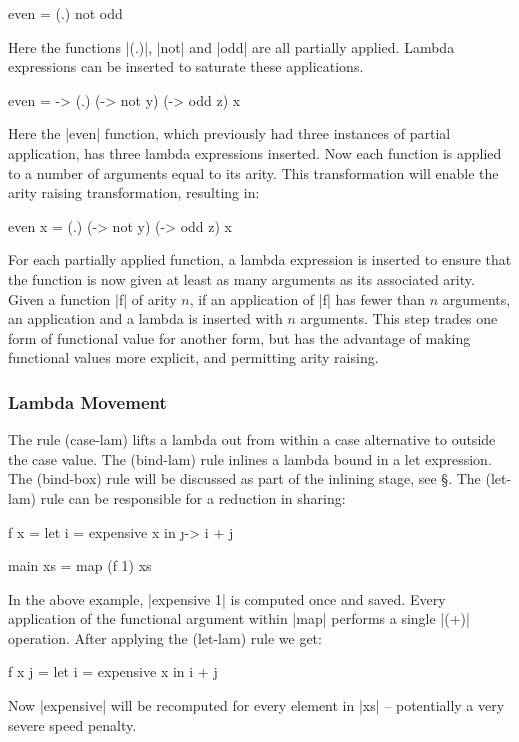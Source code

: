\documentclass[preprint]{sigplanconf}
\begin{document}
\begin{example}
\begin{code}
even = (.) not odd
\end{code}

Here the functions |(.)|, |not| and |odd| are all partially applied. Lambda expressions can be inserted to saturate these applications.

\begin{code}
even = \x -> (.) (\y -> not y) (\z -> odd z) x
\end{code}

Here the |even| function, which previously had three instances of partial application, has three lambda expressions inserted. Now each function is applied to a number of arguments equal to its arity. This transformation will enable the arity raising transformation, resulting in:

\begin{code}
even x = (.) (\y -> not y) (\z -> odd z) x
\end{code}
\end{example}

For each partially applied function, a lambda expression is inserted to ensure that the function is now given at least as many arguments as its associated arity. Given a function |f| of arity $n$, if an application of |f| has fewer than $n$ arguments, an application and a lambda is inserted with $n$ arguments. This step trades one form of functional value for another form, but has the advantage of making functional values more explicit, and permitting arity raising.

\subsubsection{Lambda Movement}
\label{sec:sharing}

The rule (case-lam) lifts a lambda out from within a case alternative to outside the case value. The (bind-lam) rule inlines a lambda bound in a let expression. The (bind-box) rule will be discussed as part of the inlining stage, see \S\label{sec:inlining}. The (let-lam) rule can be responsible for a reduction in sharing:

\begin{example}
\begin{code}
f x = let i = expensive x
      in \j -> i + j

main xs = map (f 1) xs
\end{code}

In the above example, |expensive 1| is computed once and saved. Every application of the functional argument within |map| performs a single |(+)| operation. After applying the (let-lam) rule we get:

\begin{code}
f x j = let i = expensive x
        in i + j
\end{code}

Now |expensive| will be recomputed for every element in |xs| -- potentially a very severe speed penalty.
\end{example}
\end{document}
